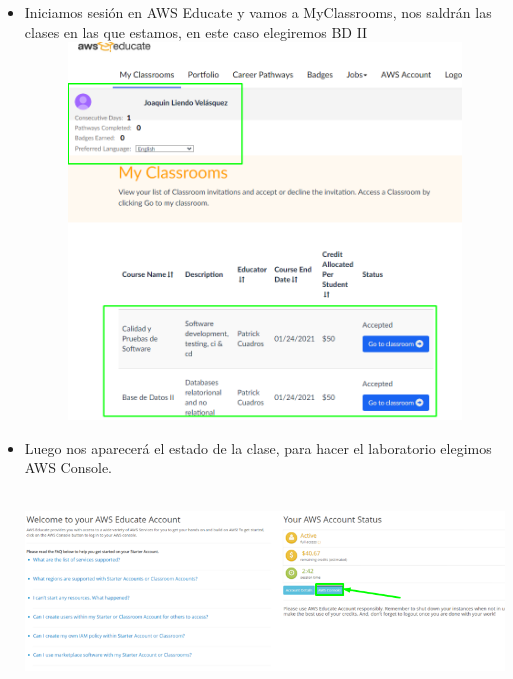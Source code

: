 \documentclass[12pt,a4paper,oneside]{book}
\begin{document}
\newpage
\begin{itemize}
	\item {Iniciamos sesión en AWS Educate y vamos a MyClassrooms, nos saldrán las clases en las que estamos, en este caso elegiremos BD II}\\
	
	\includegraphics[width=16cm, height=10cm]{img/1.png}\\
	
	\item {Luego nos aparecerá el estado de la clase, para hacer el laboratorio elegimos AWS Console.}\\
	
	\includegraphics[width=16cm, height=6cm]{img/2.png}\\
	
\end{itemize}
\end{document}
